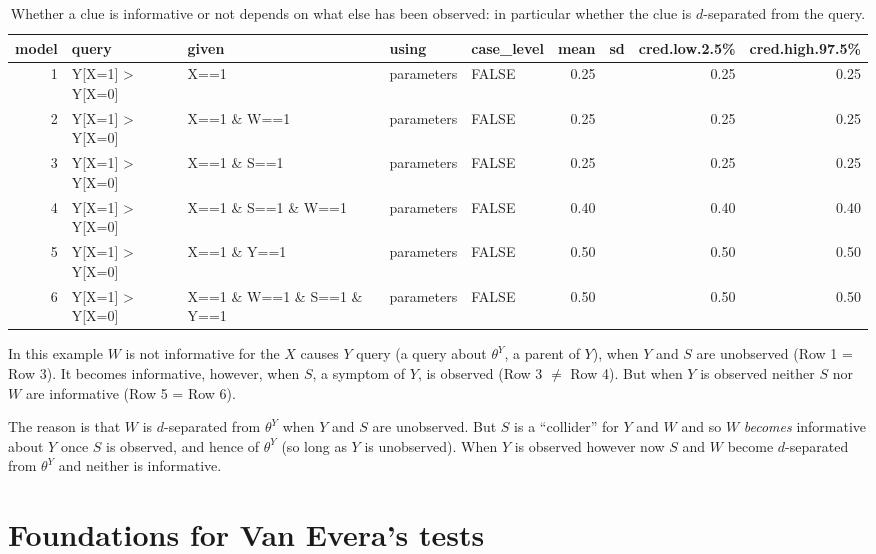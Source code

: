 \documentclass[
  12pt,
]{book}
\begin{document}
\begin{table}

\caption{\label{tab:unnamed-chunk-88}Whether a clue is informative or not depends on what else has been observed: in particular whether the clue is $d$-separated from the query.}
\centering
\begin{tabular}[t]{r|l|l|l|l|r|r|r|r}
\hline
model & query & given & using & case\_level & mean & sd & cred.low.2.5\% & cred.high.97.5\%\\
\hline
1 & Y[X=1] > Y[X=0] & X==1 & parameters & FALSE & 0.25 &  & 0.25 & 0.25\\
\hline
2 & Y[X=1] > Y[X=0] & X==1 \& W==1 & parameters & FALSE & 0.25 &  & 0.25 & 0.25\\
\hline
3 & Y[X=1] > Y[X=0] & X==1 \& S==1 & parameters & FALSE & 0.25 &  & 0.25 & 0.25\\
\hline
4 & Y[X=1] > Y[X=0] & X==1 \& S==1 \& W==1 & parameters & FALSE & 0.40 &  & 0.40 & 0.40\\
\hline
5 & Y[X=1] > Y[X=0] & X==1 \& Y==1 & parameters & FALSE & 0.50 &  & 0.50 & 0.50\\
\hline
6 & Y[X=1] > Y[X=0] & X==1 \& W==1 \& S==1 \& Y==1 & parameters & FALSE & 0.50 &  & 0.50 & 0.50\\
\hline
\end{tabular}
\end{table}

In this example \(W\) is not informative for the \(X\) causes \(Y\) query (a query about \(\theta^Y\), a parent of \(Y\)), when \(Y\) and \(S\) are unobserved (Row 1 = Row 3). It becomes informative, however, when \(S\), a symptom of \(Y\), is observed (Row 3 \(\neq\) Row 4). But when \(Y\) is observed neither \(S\) nor \(W\) are informative (Row 5 = Row 6).

The reason is that \(W\) is \(d\)-separated from \(\theta^Y\) when \(Y\) and \(S\) are unobserved. But \(S\) is a ``collider'' for \(Y\) and \(W\) and so \(W\) \emph{becomes} informative about \(Y\) once \(S\) is observed, and hence of \(\theta^Y\) (so long as \(Y\) is unobserved). When \(Y\) is observed however now \(S\) and \(W\) become \(d\)-separated from \(\theta^Y\) and neither is informative.

\hypertarget{foundations-for-van-everas-tests}{%
\section{Foundations for Van Evera's tests}\label{foundations-for-van-everas-tests}}
\end{document}
